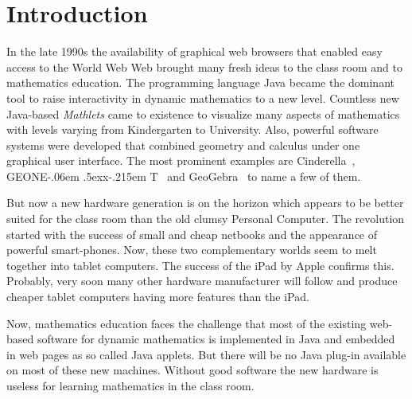 \documentclass[12pt,a4paper]{article}%
\def\GEONExT{GEONE\kern-.06em \lower.5ex\hbox{x}\kern-.215em T}
\begin{document}
\thispagestyle{fancy}                                     %
%
%



\section{Introduction}
In the late 1990s the availability of graphical web browsers that enabled easy access to the World Web Web 
brought many fresh ideas to the class room and to mathematics education. 
The programming language Java became the dominant tool to raise interactivity in 
dynamic mathematics to a new level. Countless new Java-based \emph{Mathlets} came to existence 
to visualize many aspects of mathematics with levels varying from Kindergarten to University. 
Also, powerful software systems were developed that combined geometry and calculus 
under one graphical user interface. The most prominent examples are 
Cinderella~\cite{kortenkamp1999}, \GEONExT~\cite{ehmann2003} and GeoGebra~\cite{hohenwarter2005} 
to name a few of them.

But now a new hardware generation is on the horizon which appears to be better suited 
for the class room than the old clumsy Personal Computer. 
The revolution started with the success of small and cheap netbooks and the appearance of 
powerful smart-phones. 
Now, these two complementary worlds seem to melt together into tablet computers. 
The success of the iPad by Apple confirms this. 
Probably, very soon many other hardware manufacturer will follow and produce 
cheaper tablet computers having more features than the iPad.

Now, mathematics education faces the challenge that most of the existing web-based software 
for dynamic mathematics is implemented in Java and embedded in web pages as so called Java applets.  
But there will be no Java plug-in available on most of these new machines. 
Without good software the new hardware is useless for learning mathematics 
in the class room.
\end{document}
